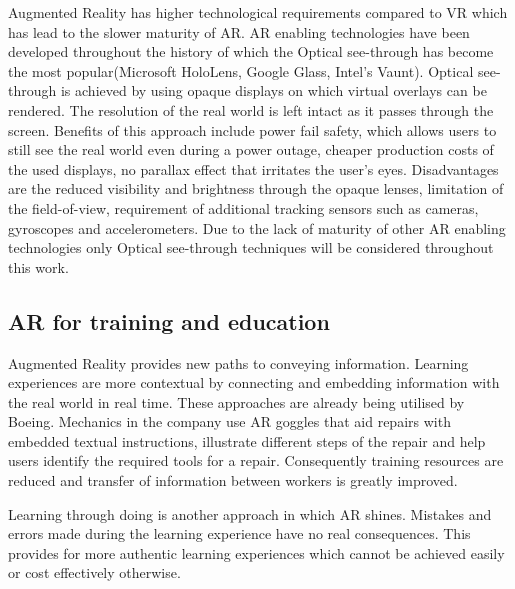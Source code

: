 \documentclass[12pt, a4paper,oneside, nocenter]{thesis}
\begin{document}
\par
Augmented Reality has higher technological requirements compared to VR which has lead to the slower maturity of AR. AR enabling technologies have been developed throughout the history of which the Optical see-through has become the most popular(Microsoft HoloLens, Google Glass, Intel's Vaunt). Optical see-through is achieved by using opaque displays on which virtual overlays can be rendered. The resolution of the real world is left intact as it passes through the screen. Benefits of this approach include power fail safety, which allows users to still see the real world even during a power outage, cheaper production costs of the used displays, no parallax effect that irritates the user's eyes. Disadvantages are the reduced visibility and brightness through the opaque lenses, limitation of the field-of-view, requirement of additional tracking sensors such as cameras, gyroscopes and accelerometers. Due to the lack of maturity of other AR enabling technologies only Optical see-through techniques will be considered throughout this work\citep{vrjournal}.
\subsection{AR for training and education}%
Augmented Reality provides new paths to conveying information. Learning experiences are more contextual by connecting and embedding information with the real world in real time. These approaches are already being utilised by Boeing. 
Mechanics in the company use AR goggles that aid repairs with embedded textual instructions, 
illustrate different steps of the repair and help users identify the required tools for a repair. 
Consequently training resources are reduced and transfer of information between workers is greatly 
improved\citep{horizon-report}.\par
Learning through doing is another approach in which AR shines. Mistakes and errors made during the learning
experience have no real consequences. This provides for more authentic learning experiences which cannot be
achieved easily or cost effectively otherwise\citep{augmented-reality}.
\end{document}
